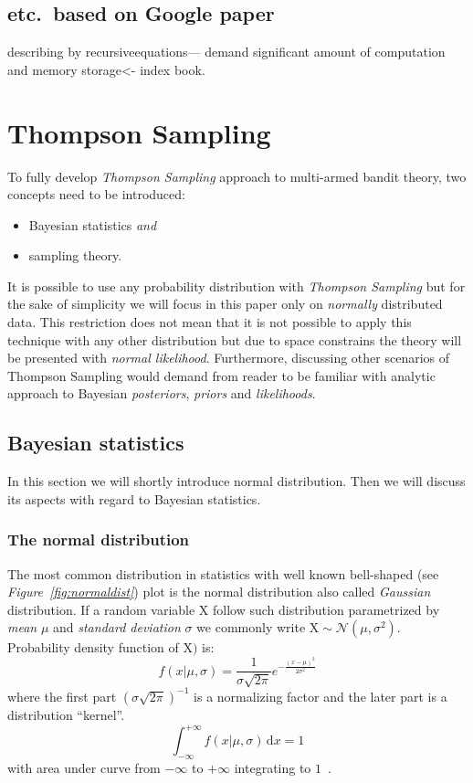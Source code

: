 \documentclass[12pt, a4paper, pdflatex]{report}
\begin{document}
\subsection{etc.\ based on Google paper}

describing by recursiveequations--- demand significant amount of computation and memory storage<- index book.


\section{Thompson Sampling\label{sec:thompsonsampling}}
To fully develop \emph{Thompson Sampling} approach to multi-armed bandit theory, two concepts need to be introduced:
\begin{itemize}
\item Bayesian statistics \emph{and}
\item sampling theory.
\end{itemize}
It is possible to use any probability distribution with \emph{Thompson Sampling} but for the sake of simplicity we will focus in this paper only on \emph{normally} distributed data. This restriction does not mean that it is not possible to apply this technique with any other distribution but due to space constrains the theory will be presented with \emph{normal likelihood}. Furthermore, discussing other scenarios of Thompson Sampling would demand from reader to be familiar with analytic approach to Bayesian \emph{posteriors}, \emph{priors} and \emph{likelihoods}.

\subsection{Bayesian statistics}
In this section we will shortly introduce normal distribution. Then we will discuss its aspects with regard to Bayesian statistics.

\subsubsection{The normal distribution}
The most common distribution in statistics with well known bell-shaped (see \emph{Figure~\ref{fig:normaldist}}) plot is the normal distribution also called \emph{Gaussian} distribution. If a random variable $\mathrm{X}$ follow such distribution parametrized by \emph{mean} $\mu$ and \emph{standard deviation} $\sigma$ we commonly write $\mathrm{X} \sim \mathcal{N}\left( \mu, \sigma^2 \right)$. Probability density function of $\mathrm{X})$ is:
$$
f \left(x | \mu, \sigma \right) = \frac{1}{\sigma \sqrt{2 \pi }} e^{- \frac{ {\left (  x - \mu \right )}^2 }{2 \sigma^2} }
$$
where the first part ${\left( \sigma \sqrt{2 \pi } \right)}^{-1}$ is a normalizing factor and the later part is a distribution ``kernel''.
$$
\int_{-\infty}^{+\infty} \! f \left(x | \mu, \sigma \right) \, \mathrm{d}x = 1
$$
with area under curve from $-\infty$ to $+\infty$ integrating to $1$~\cite{rice1995mathematical}.
\end{document}
